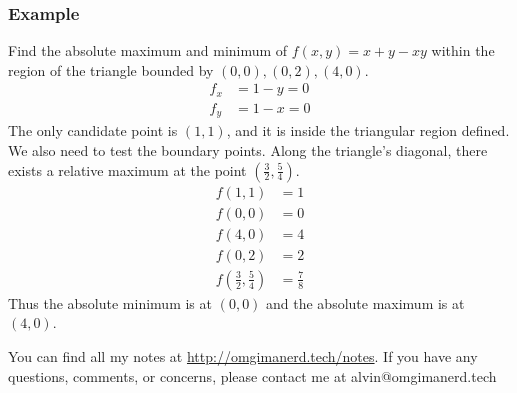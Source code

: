 \documentclass{math}
\begin{document}
\subsubsection*{Example}
Find the absolute maximum and minimum of \( f(x,y) = x+y-xy \) within the
region of the triangle bounded by \( (0,0),(0,2),(4,0) \).
\begin{align*}
  f_x &= 1-y = 0 \\
  f_y &= 1-x = 0
\end{align*}
The only candidate point is \( (1,1) \), and it is inside the triangular
region defined. We also need to test the boundary points. Along the triangle's
diagonal, there exists a relative maximum at the point \( (\frac{3}{2},
\frac{5}{4}) \).
\begin{align*}
  f(1,1) &= 1 \\
  f(0,0) &= 0 \\
  f(4,0) &= 4 \\
  f(0,2) &= 2 \\
  f(\frac{3}{2},\frac{5}{4}) &= \frac{7}{8}
\end{align*}
Thus the absolute minimum is at \( (0,0) \) and the absolute maximum is at
\( (4,0) \).

\begin{center}
  You can find all my notes at \url{http://omgimanerd.tech/notes}. If you have
  any questions, comments, or concerns, please contact me at
  alvin@omgimanerd.tech
\end{center}
\end{document}
